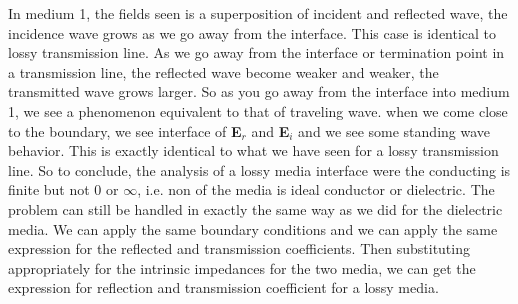 In medium 1, the fields seen is a superposition of incident and reflected wave, the incidence wave grows as we go away from the interface. This case is identical to lossy transmission line. As we go away from the interface or termination point in a transmission line, the reflected wave become weaker and weaker, the transmitted wave grows larger. So as you go away from the interface into medium 1, we see a phenomenon equivalent to that of traveling wave. when we come close to the boundary, we see interface of \textbf{E}$_r$ and \textbf{E}$_i$ and we see some standing wave behavior. This is exactly identical to what we have seen for a lossy transmission line.
So to conclude, the analysis of a lossy media interface were the conducting is finite but not 0 or $\infty$, i.e. non of the media is ideal conductor or dielectric. The problem can still be handled in exactly the same way as we did for the dielectric media. We can apply the same boundary conditions and we can apply the same expression for the reflected and transmission coefficients. Then substituting appropriately for the intrinsic impedances for the two media, we can get the expression for reflection and transmission coefficient for a lossy media. 



